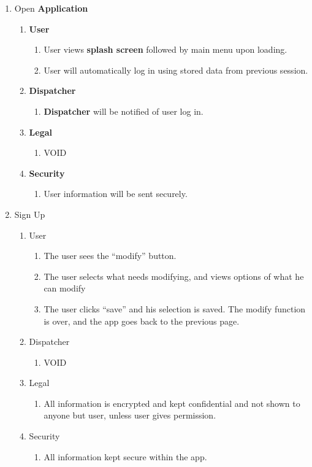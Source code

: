 \documentclass[english]{article}
\begin{document}
\begin{enumerate}[{BE}1.]
	\item Open \textbf{Application}
	\begin{enumerate}[{VP1}.1]
		\item \textbf{User}
			\begin{enumerate}
				\item User views \textbf{splash screen} followed by main menu upon loading.
				\item User will automatically log in using stored data from previous session.
			\end{enumerate}
		\item \textbf{Dispatcher}
			\begin{enumerate}
				\item \textbf{Dispatcher} will be notified of user log in. 
			\end{enumerate}
		\item \textbf{Legal}
			\begin{enumerate}
			\item VOID
			\end{enumerate}
		\item \textbf{Security}
			\begin{enumerate}
			\item User information will be sent securely.
			\end{enumerate}
	\end{enumerate}

	\item Sign Up	
	\begin{enumerate}[{VP2}.1]
		\item User
			\begin{enumerate}
				\item The user sees the “modify” button.
				\item The user selects what needs modifying, and views options of what he can modify
				\item The user clicks “save” and his selection is saved. The modify function is over, and the app goes back to the previous page.
			\end{enumerate}
		\item Dispatcher
			\begin{enumerate}
				\item VOID
			\end{enumerate}
		\item Legal
			\begin{enumerate}
				\item All information is encrypted and kept confidential and not shown to anyone but user, unless user gives permission.
			\end{enumerate}
			\item Security
			\begin{enumerate}
				\item All information kept secure within the app.
			\end{enumerate}
	\end{enumerate}


\end{enumerate}
\end{document}
